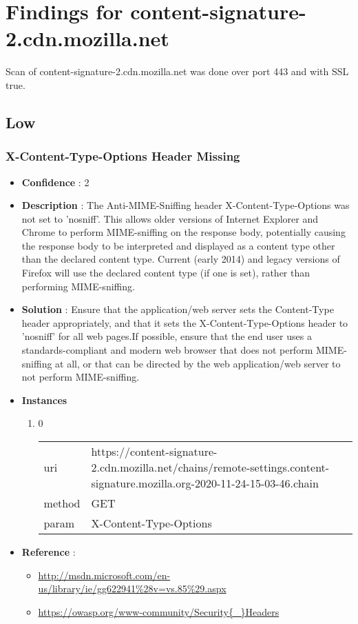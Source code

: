 \documentclass[10pt]{article}
\begin{document}
\section{Findings for content-signature-2.cdn.mozilla.net}
Scan of content-signature-2.cdn.mozilla.net was done over port 443 and with SSL true.
\subsection{Low}
\subsubsection{X-Content-Type-Options Header Missing}
\begin{itemize}
\item[] \textbf{Confidence} : 2
\item[] \textbf{Description} : The Anti-MIME-Sniffing header X-Content-Type-Options was not set to 'nosniff'. This allows older versions of Internet Explorer and Chrome to perform MIME-sniffing on the response body, potentially causing the response body to be interpreted and displayed as a content type other than the declared content type. Current (early 2014) and legacy versions of Firefox will use the declared content type (if one is set), rather than performing MIME-sniffing.
\item[] \textbf{Solution} :  Ensure that the application/web server sets the Content-Type header appropriately, and that it sets the X-Content-Type-Options header to 'nosniff' for all web pages.If possible, ensure that the end user uses a standards-compliant and modern web browser that does not perform MIME-sniffing at all, or that can be directed by the web application/web server to not perform MIME-sniffing.
\item[] \textbf{Instances}
\begin{enumerate}
\item[] 0
\begin{tabular}{| l | p{14cm}}
uri & https://content-signature-2.cdn.mozilla.net/chains/remote-settings.content-signature.mozilla.org-2020-11-24-15-03-46.chain \\
method & GET \\
param & X-Content-Type-Options \\
\end{tabular}
\end{enumerate}
\item[] \textbf{Reference} : 
\begin{itemize}
\item \url{http://msdn.microsoft.com/en-us/library/ie/gg622941\%28v=vs.85\%29.aspx}
\item \url{https://owasp.org/www-community/Security{\_}Headers}
\end{itemize}
\end{itemize}
\end{document}
